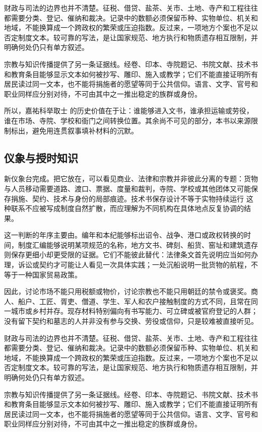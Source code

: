 财政与司法的边界也并不清楚。征税、借贷、盐茶、关市、土地、寺产和工程往往都需要分类、登记、催纳和裁决。记录中的数额必须保留币种、实物单位、机关和地域，不能换算成一个跨政权的繁荣或压迫指数。反过来，一项地方个案也不足以否定制度文本。较可靠的写法，是让国家规范、地方执行和物质遗存相互限制，并明确何处仍只有单方叙述。

宗教与知识传播提供了另一条证据线。经卷、印本、寺院题记、书院文献、技术书和教育条目能够显示文本如何被抄写、雕印、施入或教学；它们不能直接证明所有居民读过同一文本，也不能将捐施者的愿望等同于公共信仰。语言、文字、官号和职业同样应分别对待，不可由其中之一推出稳定的族群或身份。

所以，嘉祐科举取士 的历史价值在于让：谁能够进入文书，谁承担运输或劳役，谁在市场、寺院、学校和衙门之间转换位置。其余尚不可见的部分，本书以来源限制标出，避免用连贯叙事填补材料的沉默。

\subsection{仪象与授时知识}

新仪象台完成。把它放在，可以看见商业、法律和宗教并非彼此分离的专题：货物与人员移动需要道路、渡口、票据、度量和裁判，寺院、学校或其他团体又可能保存捐施、契约、技术与身份的局部痕迹。技术书保存设计不等于实物持续运行 这种联系不应被写成制度自然扩散，而应理解为不同机构在具体地点反复协调的结果。

这一判断的年序主要由。编年和本纪能够标出诏令、战争、港口或政权转换的时间，制度汇编能够说明某项规范的名称，地方文书、碑刻、船货、窑址和建筑遗存则保存更细小却更受限的证据。它们不能彼此替代：法律条文首先说明应当如何办理，诉讼或契约才可能让人看见一次具体实践；一处沉船说明一批货物的航程，不等于一种国家贸易政策。

因此，讨论市场不能只用税额或物价，讨论宗教也不能只用朝廷的禁令或褒奖。商人、船户、工匠、胥吏、僧道、学生、军人和农户接触制度的方式不同，且常在同一城市或乡村并存。现存材料特别偏向有书写能力、可立碑或被官府登记的人群；没有留下契约和墓志的人并非没有参与交换、劳役或信仰，只是较难被直接听见。

财政与司法的边界也并不清楚。征税、借贷、盐茶、关市、土地、寺产和工程往往都需要分类、登记、催纳和裁决。记录中的数额必须保留币种、实物单位、机关和地域，不能换算成一个跨政权的繁荣或压迫指数。反过来，一项地方个案也不足以否定制度文本。较可靠的写法，是让国家规范、地方执行和物质遗存相互限制，并明确何处仍只有单方叙述。

宗教与知识传播提供了另一条证据线。经卷、印本、寺院题记、书院文献、技术书和教育条目能够显示文本如何被抄写、雕印、施入或教学；它们不能直接证明所有居民读过同一文本，也不能将捐施者的愿望等同于公共信仰。语言、文字、官号和职业同样应分别对待，不可由其中之一推出稳定的族群或身份。

